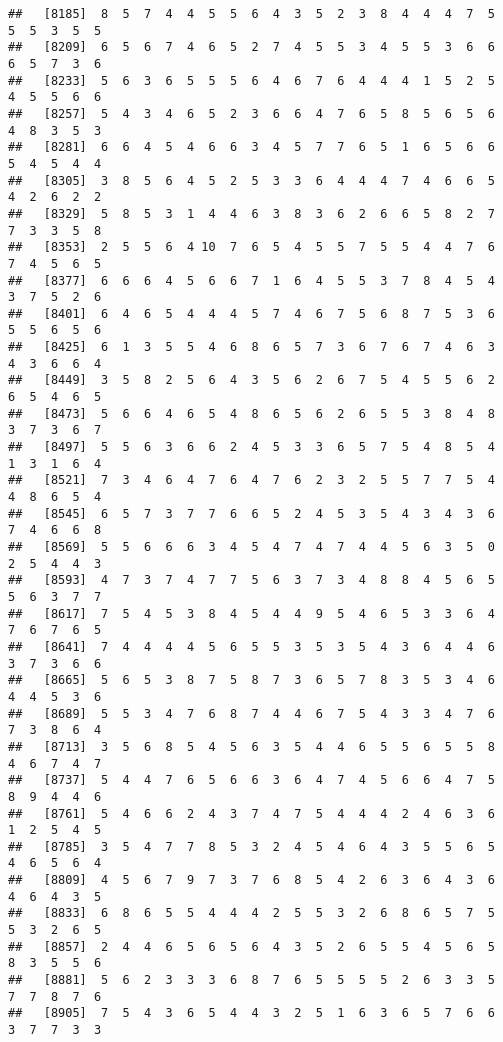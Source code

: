 \documentclass[
]{book}
\begin{document}
\begin{verbatim}
##   [8185]  8  5  7  4  4  5  5  6  4  3  5  2  3  8  4  4  4  7  5  5  5  3  5  5
##   [8209]  6  5  6  7  4  6  5  2  7  4  5  5  3  4  5  5  3  6  6  6  5  7  3  6
##   [8233]  5  6  3  6  5  5  5  6  4  6  7  6  4  4  4  1  5  2  5  4  5  5  6  6
##   [8257]  5  4  3  4  6  5  2  3  6  6  4  7  6  5  8  5  6  5  6  4  8  3  5  3
##   [8281]  6  6  4  5  4  6  6  3  4  5  7  7  6  5  1  6  5  6  6  5  4  5  4  4
##   [8305]  3  8  5  6  4  5  2  5  3  3  6  4  4  4  7  4  6  6  5  4  2  6  2  2
##   [8329]  5  8  5  3  1  4  4  6  3  8  3  6  2  6  6  5  8  2  7  7  3  3  5  8
##   [8353]  2  5  5  6  4 10  7  6  5  4  5  5  7  5  5  4  4  7  6  7  4  5  6  5
##   [8377]  6  6  6  4  5  6  6  7  1  6  4  5  5  3  7  8  4  5  4  3  7  5  2  6
##   [8401]  6  4  6  5  4  4  4  5  7  4  6  7  5  6  8  7  5  3  6  5  5  6  5  6
##   [8425]  6  1  3  5  5  4  6  8  6  5  7  3  6  7  6  7  4  6  3  4  3  6  6  4
##   [8449]  3  5  8  2  5  6  4  3  5  6  2  6  7  5  4  5  5  6  2  6  5  4  6  5
##   [8473]  5  6  6  4  6  5  4  8  6  5  6  2  6  5  5  3  8  4  8  3  7  3  6  7
##   [8497]  5  5  6  3  6  6  2  4  5  3  3  6  5  7  5  4  8  5  4  1  3  1  6  4
##   [8521]  7  3  4  6  4  7  6  4  7  6  2  3  2  5  5  7  7  5  4  4  8  6  5  4
##   [8545]  6  5  7  3  7  7  6  6  5  2  4  5  3  5  4  3  4  3  6  7  4  6  6  8
##   [8569]  5  5  6  6  6  3  4  5  4  7  4  7  4  4  5  6  3  5  0  2  5  4  4  3
##   [8593]  4  7  3  7  4  7  7  5  6  3  7  3  4  8  8  4  5  6  5  5  6  3  7  7
##   [8617]  7  5  4  5  3  8  4  5  4  4  9  5  4  6  5  3  3  6  4  7  6  7  6  5
##   [8641]  7  4  4  4  4  5  6  5  5  3  5  3  5  4  3  6  4  4  6  3  7  3  6  6
##   [8665]  5  6  5  3  8  7  5  8  7  3  6  5  7  8  3  5  3  4  6  4  4  5  3  6
##   [8689]  5  5  3  4  7  6  8  7  4  4  6  7  5  4  3  3  4  7  6  7  3  8  6  4
##   [8713]  3  5  6  8  5  4  5  6  3  5  4  4  6  5  5  6  5  5  8  4  6  7  4  7
##   [8737]  5  4  4  7  6  5  6  6  3  6  4  7  4  5  6  6  4  7  5  8  9  4  4  6
##   [8761]  5  4  6  6  2  4  3  7  4  7  5  4  4  4  2  4  6  3  6  1  2  5  4  5
##   [8785]  3  5  4  7  7  8  5  3  2  4  5  4  6  4  3  5  5  6  5  4  6  5  6  4
##   [8809]  4  5  6  7  9  7  3  7  6  8  5  4  2  6  3  6  4  3  6  4  6  4  3  5
##   [8833]  6  8  6  5  5  4  4  4  2  5  5  3  2  6  8  6  5  7  5  5  3  2  6  5
##   [8857]  2  4  4  6  5  6  5  6  4  3  5  2  6  5  5  4  5  6  5  8  3  5  5  6
##   [8881]  5  6  2  3  3  3  6  8  7  6  5  5  5  5  2  6  3  3  5  7  7  8  7  6
##   [8905]  7  5  4  3  6  5  4  4  3  2  5  1  6  3  6  5  7  6  6  3  7  7  3  3

\end{verbatim}
\end{document}
